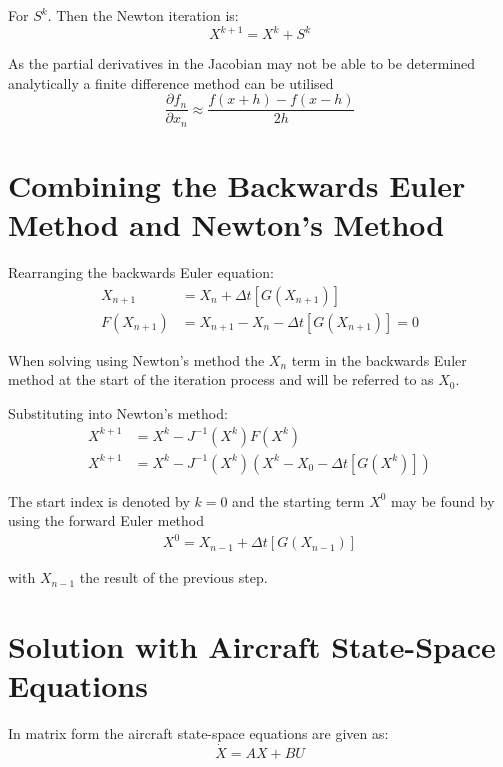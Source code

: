 \documentclass[11pt]{article}
\begin{document}
For $S^k$. Then the Newton iteration is:
\begin{equation}
  X^{k+1} = X^k + S^k
\end{equation}

As the partial derivatives in the Jacobian may not be able to be determined analytically a finite difference method can be utilised
\begin{equation}
  \frac{\partial f_n}{\partial x_n} \approx \frac{f(x+h) - f(x-h)}{2h}
\end{equation}
\section{Combining the Backwards Euler Method and Newton's Method}
Rearranging the backwards Euler equation:
\begin{subequations}
  \begin{align}
    X_{n+1} &= X_n + \Delta t \left[G\left(X_{n+1}\right)\right] \\
    F(X_{n+1}) &= X_{n+1} - X_n - \Delta t \left[G\left(X_{n+1}\right)\right] = 0
  \end{align}
\end{subequations}

When solving using Newton's method the $X_n$ term in the backwards Euler method at the start of the iteration process and will be referred to as $X_0$.

Substituting into Newton's method:
\begin{subequations}
  \begin{align}
    X^{k+1} &= X^k - J^{-1}(X^k) F(X^k) \\
    X^{k+1} &= X^k - J^{-1}({X^k})\left(X^k - X_0 - \Delta t \left[G(X^k)\right]\right)
  \end{align}
\end{subequations}

The start index is denoted by $k=0$ and the starting term $X^0$ may be found by using the forward Euler method
\begin{subequations}
  \begin{align}
    X^0 = X_{n-1} + \Delta t \left[G(X_{n-1})\right]
  \end{align}
\end{subequations}

with $X_{n-1}$ the result of the previous step.
\section{Solution with Aircraft State-Space Equations}
In matrix form the aircraft state-space equations are given as:
\begin{equation}
  \dot{X} = AX + BU
\end{equation}
\end{document}
